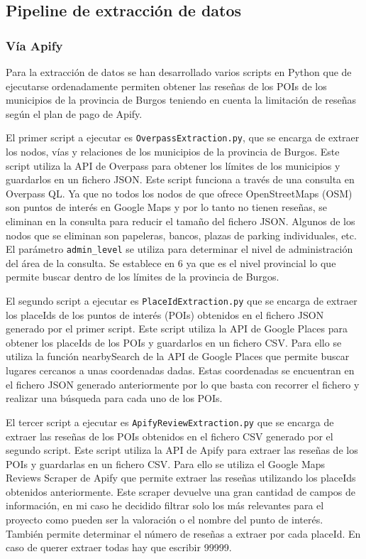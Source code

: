 \subsection{Pipeline de extracción de datos}

\subsubsection{Vía Apify}

Para la extracción de datos se han desarrollado varios scripts en Python que de ejecutarse ordenadamente permiten obtener las reseñas de los POIs de los municipios de la provincia de Burgos teniendo en cuenta la limitación de reseñas según el plan de pago de Apify.

El primer script a ejecutar es \texttt{OverpassExtraction.py}, que se encarga de extraer los nodos, vías y relaciones de los municipios de la provincia de Burgos. 
Este script utiliza la API de Overpass para obtener los límites de los municipios y guardarlos en un fichero JSON.
Este script funciona a través de una consulta en Overpass QL. Ya que no todos los nodos de que ofrece OpenStreetMaps (OSM) son puntos de interés en Google Maps y por lo tanto no tienen reseñas, se eliminan en la consulta para reducir el tamaño del fichero JSON.
Algunos de los nodos que se eliminan son papeleras, bancos, plazas de parking individuales, etc.
El parámetro \texttt{admin\_level} se utiliza para determinar el nivel de administración del área de la consulta. Se establece en 6 ya que es el nivel provincial lo que permite buscar dentro de los límites de la provincia de Burgos.

El segundo script a ejecutar es \texttt{PlaceIdExtraction.py} que se encarga de extraer los placeIds de los puntos de interés (POIs) obtenidos en el fichero JSON generado por el primer script.
Este script utiliza la API de Google Places para obtener los placeIds de los POIs y guardarlos en un fichero CSV.
Para ello se utiliza la función nearbySearch de la API de Google Places que permite buscar lugares cercanos a unas coordenadas dadas. Estas coordenadas se encuentran en el fichero JSON generado anteriormente por lo que basta 
con recorrer el fichero y realizar una búsqueda para cada uno de los POIs.

El tercer script a ejecutar es \texttt{ApifyReviewExtraction.py} que se encarga de extraer las reseñas de los POIs obtenidos en el fichero CSV generado por el segundo script.
Este script utiliza la API de Apify para extraer las reseñas de los POIs y guardarlas en un fichero CSV.
Para ello se utiliza el Google Maps Reviews Scraper de Apify que permite extraer las reseñas utilizando los placeIds obtenidos anteriormente.
Este scraper devuelve una gran cantidad de campos de información, en mi caso he decidido filtrar solo los más relevantes para el proyecto como pueden ser la valoración o el nombre del punto de interés.
También permite determinar el número de reseñas a extraer por cada placeId. En caso de querer extraer todas hay que escribir 99999.

